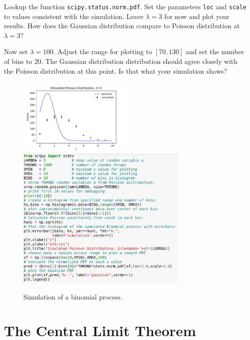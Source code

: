 \begin{plot} \end{plot}
Lookup the function {\tt scipy.status.norm.pdf}.  Set the parameters
{\tt loc} and {\tt scale} to values consistent with the simulation.
Leave $\lambda=3$ for now and plot your results.  How does the Gaussian distribution compare to Poisson distribution at $\lambda=3$?

\begin{plot} \end{plot}
Now set $\lambda=100$.  Adjust the range for plotting to $[70,130]$ and set the number of bins to 20.
The Gaussian distribution distribution should agree closely with the Poisson distribution at this point.  Is that what your simulation shows?

\begin{figure}[htbp]
\begin{center}
  \includegraphics[width=0.50\textwidth]{figs/limits/poisson.pdf}
  \includegraphics[width=0.75\textwidth]{figs/limits/poisson-code.png} 
\caption{Simulation of a binomial process.}
\label{fig:poisson}
\end{center}
\end{figure}


\section{The Central Limit Theorem}

